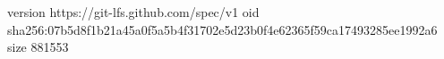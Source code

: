 version https://git-lfs.github.com/spec/v1
oid sha256:07b5d8f1b21a45a0f5a5b4f31702e5d23b0f4e62365f59ca17493285ee1992a6
size 881553
